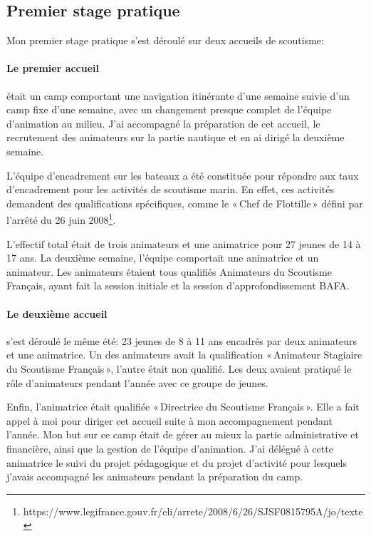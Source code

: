 \documentclass[titlepage,11pt,a4paper]{article}
\begin{document}
\subsection{Premier stage pratique}

Mon premier stage pratique s'est déroulé sur deux accueils de scoutisme:

\paragraph{Le premier accueil} était un camp comportant une navigation itinérante d'une
semaine suivie d'un
camp fixe d'une semaine, avec un changement presque complet de l'équipe d'animation au
milieu. J'ai accompagné la préparation de cet accueil, le recrutement des animateurs sur
la partie nautique et en ai dirigé la deuxième semaine.

L'équipe d'encadrement sur les bateaux a été constituée pour répondre aux taux
d'encadrement pour les activités de scoutisme marin. En effet, ces activités demandent
des qualifications spécifiques, comme le «\,Chef de Flottille\,» défini par
l'arrêté du 26 juin 2008\footnote{https://www.legifrance.gouv.fr/eli/arrete/2008/6/26/SJSF0815795A/jo/texte}.

L'effectif total était de trois animateurs et une animatrice pour 27 jeunes de 14 à 17
ans. La deuxième semaine, l'équipe comportait une animatrice et un animateur. Les animateurs
étaient tous qualifiés Animateurs du Scoutisme Français,
ayant fait la session initiale et la session d'approfondissement BAFA\@.

\paragraph{Le deuxième accueil} s'est déroulé le même été: 23 jeunes de 8 à 11 ans
encadrés par deux animateurs et une animatrice. Un des animateurs avait la qualification
«\,Animateur Stagiaire du Scoutisme Français\,», l'autre était non qualifié. Les deux
avaient pratiqué le rôle d'animateurs pendant l'année avec ce groupe de jeunes.

Enfin, l'animatrice était qualifiée «\,Directrice du Scoutisme Français\,». Elle a
fait appel à moi pour diriger cet accueil suite à mon accompagnement pendant l'année. Mon but sur ce camp était
de gérer au mieux la partie administrative et financière, ainsi que la gestion de l'équipe
d'animation. J'ai délégué à cette animatrice le suivi du projet pédagogique et du projet
d'activité pour lesquels j'avais accompagné les animateurs pendant la
préparation du camp.
\end{document}
